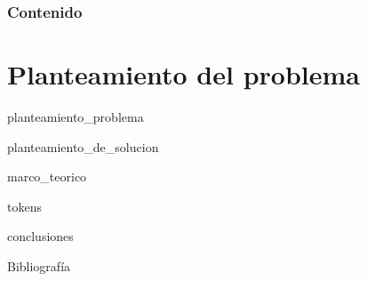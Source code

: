 \documentclass{beamer}
\begin{document}
  {
  \frame{\titlepage}}

  \begin{frame}
    \frametitle{Contenido}
    \setcounter{tocdepth}{1}
    \tableofcontents[pausesections]
  \end{frame}

  \setlength{\parskip}{0.5em}

  \section{Planteamiento del problema}

  {planteamiento_problema}

  
    {planteamiento_de_solucion}

  {marco_teorico}

  {tokens}

  {conclusiones}

  \begin{frame}[allowframebreaks]{Bibliografía}
    \printbibliography
  \end{frame}

  \setlength{\parskip}{0.0em}

  {
  \frame{\titlepage}}
\end{document}
